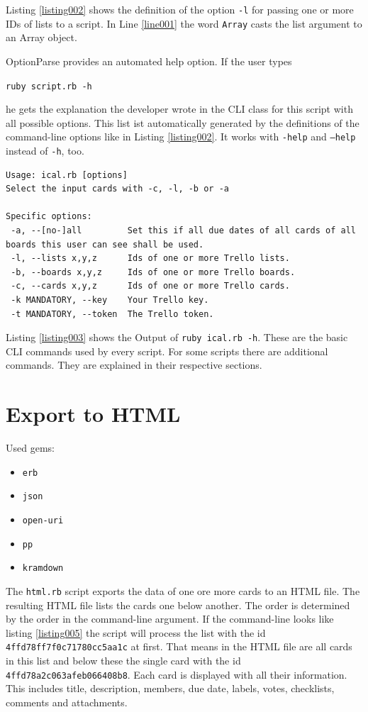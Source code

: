 Listing \ref{listing002} shows the definition of the option \texttt{-l} for passing one or more IDs of lists to a script. In Line \ref{line001} the word \lstinline{Array} casts the list argument to an Array object.

OptionParse provides an automated help option. If the user types 
\begin{center}
\texttt{ruby script.rb -h} 
\end{center}
he gets the explanation the developer wrote in the CLI class for this script with all possible options. This list ist automatically generated by the definitions of the command-line options like in Listing \ref{listing002}. It works with \texttt{-help} and \texttt{--help} instead of \texttt{-h}, too.

\begin{lstlisting}[style=bash, float=htb, caption=Output of the \texttt{-h} option., label=listing003]
Usage: ical.rb [options]
Select the input cards with -c, -l, -b or -a

Specific options:
 -a, --[no-]all         Set this if all due dates of all cards of all boards this user can see shall be used.
 -l, --lists x,y,z      Ids of one or more Trello lists.
 -b, --boards x,y,z     Ids of one or more Trello boards.
 -c, --cards x,y,z      Ids of one or more Trello cards.
 -k MANDATORY, --key    Your Trello key.
 -t MANDATORY, --token  The Trello token.
\end{lstlisting}

Listing \ref{listing003} shows the Output of \texttt{ruby ical.rb -h}. 
These are the basic CLI commands used by every script. For some scripts there are additional commands. They are explained in their respective sections.

\section{Export to HTML}

Used gems:
\begin{itemize}
	\item \texttt{erb}
	\item \texttt{json}
	\item \texttt{open-uri}
	\item \texttt{pp}
	\item \texttt{kramdown}
\end{itemize}

The \texttt{html.rb} script exports the data of one ore more cards to an HTML file. The resulting HTML file lists the cards one below another. The order is determined by the order in the command-line argument. If the command-line looks like listing \ref{listing005} the script will process the list with the id \texttt{4ffd78ff7f0c71780cc5aa1c} at first. That means in the HTML file are all cards in this list and below these the single card with the id \texttt{4ffd78a2c063afeb066408b8}.
Each card is displayed with all their information. This includes title, description, members, due date, labels, votes, checklists, comments and attachments.


